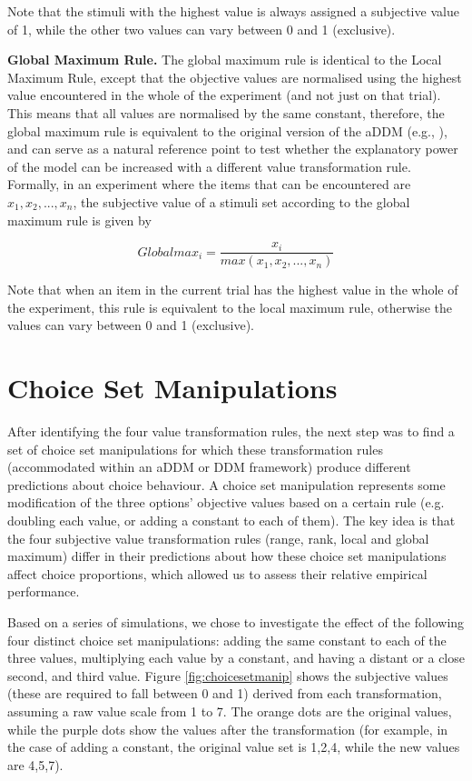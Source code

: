 \documentclass[11pt,a4paper]{article}
\begin{document}
Note that the stimuli with the highest value is always assigned a subjective value of 1, while the other two values can vary between 0 and 1 (exclusive).

\textbf{Global Maximum Rule.} The global maximum rule is identical to the Local Maximum Rule, except that the objective values are normalised using the highest value encountered in the whole of the experiment (and not just on that trial). This means that all values are normalised by the same constant, therefore, the global maximum rule is equivalent to the original version of the aDDM (e.g., ), and can serve as a natural reference point to test whether the explanatory power of the model can be increased with a different value transformation rule. Formally, in an experiment where the items that can be encountered are $x_1, x_2, ..., x_n$, the subjective value of a stimuli set according to the global maximum rule is given by

\begin{equation}
Globalmax_{i}=\frac{x_i}{max(x_1,x_2,...,x_n)}
\label{eq:globmax}
\end{equation}

Note that when an item in the current trial has the highest value in the whole of the experiment, this rule is equivalent to the local maximum rule, otherwise the values can vary between 0 and 1 (exclusive). 

\section{Choice Set Manipulations} \label{chap1choicesetman}

After identifying the four value transformation rules, the next step was to find a set of choice set manipulations for which these transformation rules (accommodated within an aDDM or DDM framework) produce different predictions about choice behaviour. A choice set manipulation represents some modification of the three options' objective values based on a certain rule (e.g. doubling each value, or adding a constant to each of them). The key idea is that the four subjective value transformation rules (range, rank, local and global maximum) differ in their predictions about how these choice set manipulations affect choice proportions, which allowed us to assess their relative empirical performance. 

Based on a series of simulations, we chose to investigate the effect of the following four distinct choice set manipulations: adding the same constant to each of the three values, multiplying each value by a constant, and having a distant or a close second, and third value. Figure \ref{fig:choicesetmanip} shows the subjective values (these are required to fall between 0 and 1) derived from each transformation, assuming a raw value scale from 1 to 7. The orange dots are the original values, while the purple dots show the values after the transformation (for example, in the case of adding a constant, the original value set is 1,2,4, while the new values are 4,5,7).
\end{document}
